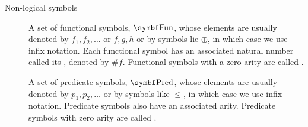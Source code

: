 \begin{definition}
\begin{description}
    \item[Non-logical symbols]\mbox{}
    \begin{DefEnum}[resume=def:first_order_logic_alphabet]
       A set of functional symbols, \( \Bold{Fun} \), whose elements are usually denoted by \( f_1, f_2, \ldots \) or \( f, g, h \) or by symbols lie \( \oplus \), in which case we use infix notation. Each functional symbol has an associated natural number called its , denoted by \( \# f \). Functional symbols with a zero arity are called .

       A set of predicate symbols, \( \Bold{Pred} \), whose elements are usually denoted by \( p_1, p_2, \ldots \) or by symbols like \( \leq \), in which case we use infix notation. Predicate symbols also have an associated arity. Predicate symbols with zero arity are called .
    \end{DefEnum}
  \end{description}
\end{definition}

